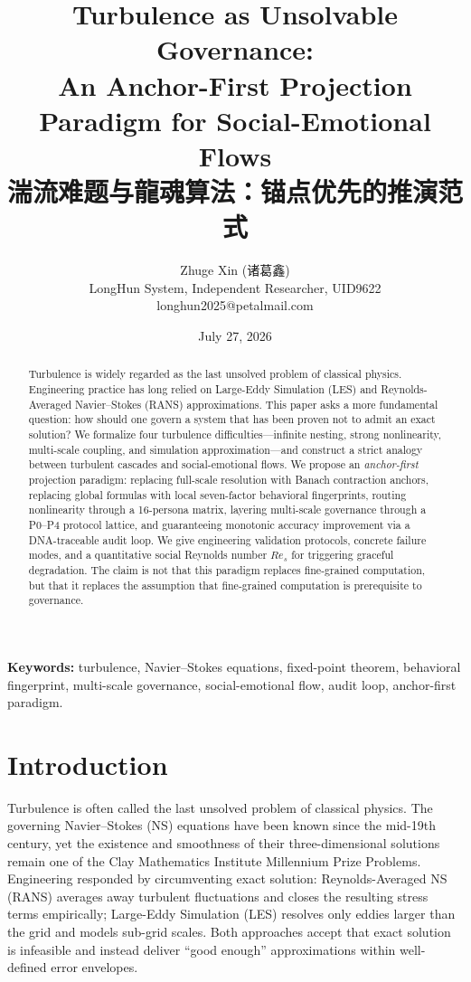 \documentclass[10pt,a4paper]{article}
\title{Turbulence as Unsolvable Governance: \\ An Anchor-First Projection Paradigm for Social-Emotional Flows \\ \large \textnormal{湍流难题与龍魂算法：锚点优先的推演范式}}}
\author{Zhuge Xin (诸葛鑫) \\ LongHun System, Independent Researcher, UID9622 \\ longhun2025@petalmail.com}
\date{July 27, 2026}
\theoremstyle{definition}
\begin{document}
\maketitle

\begin{abstract}
\noindent
Turbulence is widely regarded as the last unsolved problem of classical physics. Engineering practice has long relied on Large-Eddy Simulation (LES) and Reynolds-Averaged Navier--Stokes (RANS) approximations. This paper asks a more fundamental question: how should one govern a system that has been proven not to admit an exact solution? We formalize four turbulence difficulties---infinite nesting, strong nonlinearity, multi-scale coupling, and simulation approximation---and construct a strict analogy between turbulent cascades and social-emotional flows. We propose an \emph{anchor-first} projection paradigm: replacing full-scale resolution with Banach contraction anchors, replacing global formulas with local seven-factor behavioral fingerprints, routing nonlinearity through a 16-persona matrix, layering multi-scale governance through a P0--P4 protocol lattice, and guaranteeing monotonic accuracy improvement via a DNA-traceable audit loop. We give engineering validation protocols, concrete failure modes, and a quantitative social Reynolds number $Re_s$ for triggering graceful degradation. The claim is not that this paradigm replaces fine-grained computation, but that it replaces the assumption that fine-grained computation is prerequisite to governance.
\end{abstract}

\noindent\textbf{Keywords:} turbulence, Navier--Stokes equations, fixed-point theorem, behavioral fingerprint, multi-scale governance, social-emotional flow, audit loop, anchor-first paradigm.
\vspace{1em}

\section{Introduction}\label{sec:intro}

Turbulence is often called the last unsolved problem of classical physics\cite{Pope2000}. The governing Navier--Stokes (NS) equations have been known since the mid-19th century, yet the existence and smoothness of their three-dimensional solutions remain one of the Clay Mathematics Institute Millennium Prize Problems\cite{ClayMathNS}. Engineering responded by circumventing exact solution: Reynolds-Averaged NS (RANS) averages away turbulent fluctuations and closes the resulting stress terms empirically; Large-Eddy Simulation (LES) resolves only eddies larger than the grid and models sub-grid scales\cite{Wilcox1998}. Both approaches accept that exact solution is infeasible and instead deliver ``good enough'' approximations within well-defined error envelopes.
\end{document}
